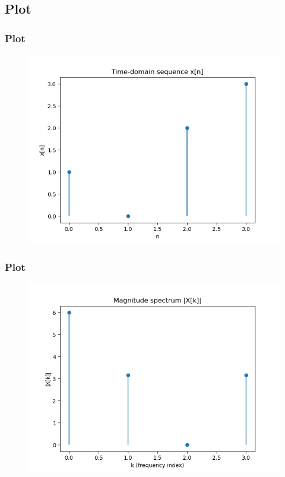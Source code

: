 \documentclass{beamer}
\theoremstyle{remark}
\numberwithin{equation}{section}
\begin{document}
\subsection{Plot}
\begin{frame}
    \frametitle{Plot}
\begin{figure}[H]
   \centering
   \includegraphics[width=0.8\columnwidth]{figs/fig3.png}
   \caption{}
   \label{}
   \end{figure}
\end{frame}

\begin{frame}
    \frametitle{Plot}
\begin{figure}[H]
   \centering
   \includegraphics[width=0.8\columnwidth]{figs/fig4.png}
   \caption{}
   \label{}
   \end{figure}
\end{frame}
\end{document}
